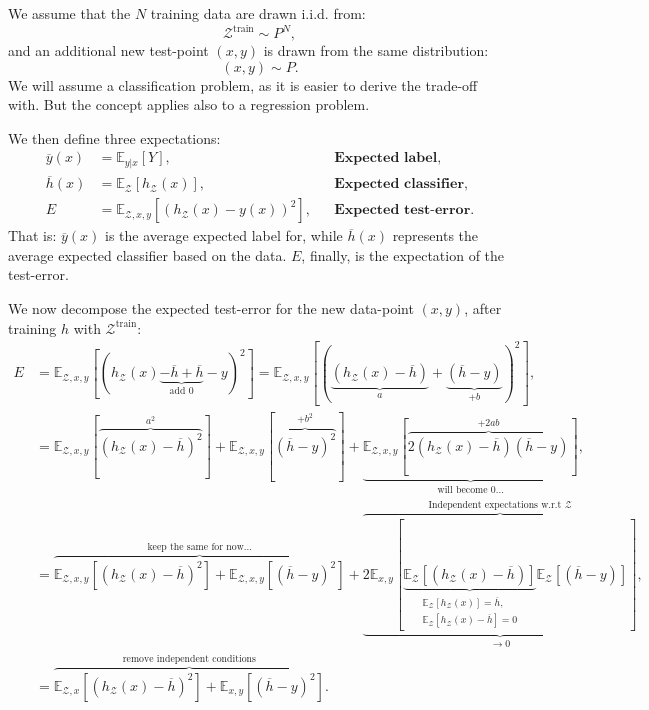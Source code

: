 \documentclass{article}
\begin{document}
\begin{spexample}
    We assume that the $N$ training data are drawn i.i.d. from:
    \begin{equation}
        \mathcal{Z}^\text{train} \sim P^N,
    \end{equation}
    and an additional new test-point $(x,y)$ is drawn from the same distribution:
    \begin{equation}
        (x,y)\sim P.
    \end{equation}
    We will assume a classification problem, as it is easier to derive the trade-off with. But the concept applies also to a regression problem.

    We then define three expectations:
    \begin{align}
        \overline{y}(x) &= \mathbb{E}_{y|x}[Y],&& \textbf{Expected label}, \\
        \overline{h}(x) &= \mathbb{E}_\mathcal{Z}[h_\mathcal{Z}(x)],&&\textbf{Expected classifier},\\
        E &= \mathbb{E}_{\mathcal{Z},x,y}[(h_\mathcal{Z}(x)-y(x))^2],&&\textbf{Expected test-error}.
    \end{align}
    That is: $\overline{y}(x)$ is the average expected label for, while $\overline{h}(x)$ represents the average expected classifier based on the data. $E$, finally, is the expectation of the test-error.
\end{spexample}
{\flushleft We} now decompose the expected test-error for the new data-point $(x,y)$, after training $h$ with $\mathcal{Z}^\text{train}$:
\begin{align}
    E & = \mathbb{E}_{\mathcal{Z},x,y}[(h_\mathcal{Z}(x) \underbrace{- \overline{h} + \overline{h}}_\text{add 0} - y)^2] = \mathbb{E}_{\mathcal{Z},x,y}[(\underbrace{(h_\mathcal{Z}(x) - \overline{h})}_{a} + \underbrace{(\overline{h} - y)}_{+b})^2],\\
    & = \mathbb{E}_{\mathcal{Z},x,y}[\overbrace{(h_\mathcal{Z}(x) - \overline{h})^2}^{a^2}] + \mathbb{E}_{\mathcal{Z},x,y}[\overbrace{(\overline{h} - y)^2}^{+b^2}] + \underbrace{\mathbb{E}_{\mathcal{Z},x,y}[\overbrace{2(h_\mathcal{Z}(x) - \overline{h})(\overline{h} - y)}^{+2ab}]}_\text{will become 0...},\\
    & = \overbrace{
            \mathbb{E}_{\mathcal{Z},x,y}[(h_\mathcal{Z}(x) - \overline{h})^2] + \mathbb{E}_{\mathcal{Z},x,y}[(\overline{h} - y)^2]
        }^\text{keep the same for now...}+ 
        \underbrace{\overbrace{
            2\mathbb{E}_{x,y}\left[
                \underbrace{\mathbb{E}_{\mathcal{Z}}[(h_\mathcal{Z}(x) - \overline{h})]}_{\substack{\mathbb{E}_\mathcal{Z}[h_\mathcal{Z}(x)]=\overline{h},\\\mathbb{E}_\mathcal{Z}[h_\mathcal{Z}(x)-\overline{h}]=0}}
            \mathbb{E}_{\mathcal{Z}}[(\overline{h} - y)]\right]}^\text{Independent expectations w.r.t $\mathcal{Z}$}}_{\to 0},\\
    & = \overbrace{\mathbb{E}_{\mathcal{Z},x}[(h_\mathcal{Z}(x) - \overline{h})^2] + \mathbb{E}_{x,y}[(\overline{h} - y)^2]}^\text{remove independent conditions}.
\end{align}
\end{document}
